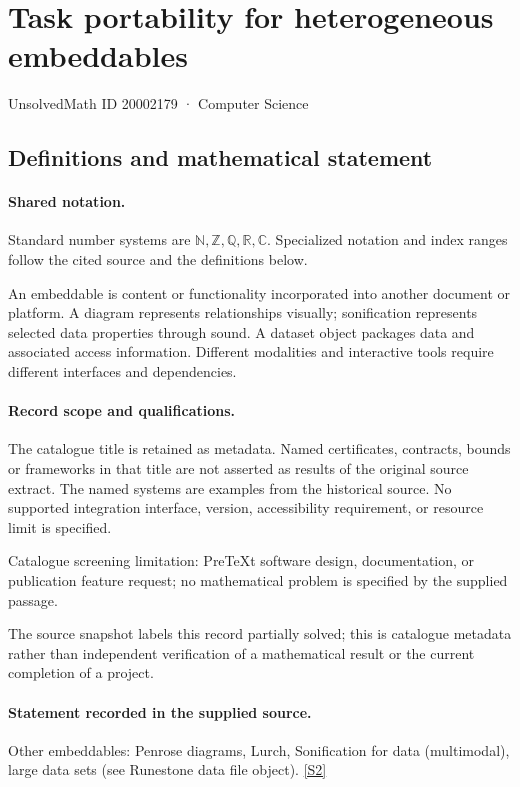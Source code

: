 \documentclass[11pt]{article}
\newcommand{\sref}[2]{\hyperlink{source:#1:#2}{[S#2]}}
\begin{document}
\setcounter{section}{20002178}
\section{Task portability for heterogeneous embeddables}\label{20002179}
{\small\sffamily UnsolvedMath ID 20002179 · Computer Science}
\subsection{Definitions and mathematical statement}

\paragraph{Shared notation.}Standard number systems are $\mathbb N,\mathbb Z,\mathbb Q,\mathbb R,\mathbb C$. Specialized notation and index ranges follow the cited source and the definitions below.


An embeddable is content or functionality incorporated into another document or platform. A diagram represents relationships visually; sonification represents selected data properties through sound. A dataset object packages data and associated access information. Different modalities and interactive tools require different interfaces and dependencies.
\paragraph{Record scope and qualifications.}
The catalogue title is retained as metadata. Named certificates, contracts, bounds or frameworks in that title are not asserted as results of the original source extract.
The named systems are examples from the historical source. No supported integration interface, version, accessibility requirement, or resource limit is specified.

Catalogue screening limitation: PreTeXt software design, documentation, or publication feature request; no mathematical problem is specified by the supplied passage.

The source snapshot labels this record partially solved; this is catalogue metadata rather than independent verification of a mathematical result or the current completion of a project.
\paragraph{Statement recorded in the supplied source.}
Other embeddables: Penrose diagrams, Lurch, Sonification for data (multimodal), large data sets (see Runestone data file object). \sref{20002179}{2}
\end{document}
